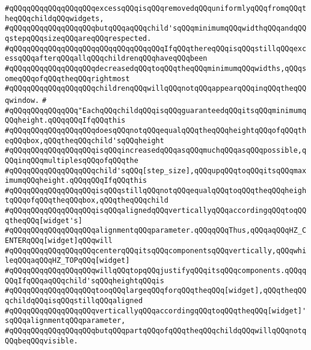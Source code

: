 \verb|#qQQqqQQqqQQqqQQqqQQqexcessqQQqisqQQqremovedqQQquniformlyqQQqfromqQQqtheqQQqchildqQQqwidgets,|\newline
\verb|#qQQqqQQqqQQqqQQqqQQqbutqQQqaqQQqchild'sqQQqminimumqQQqwidthqQQqandqQQqstepqQQqsizeqQQqareqQQqrespected.|\newline
\verb|#qQQqqQQqqQQqqQQqqQQqqQQqqQQqqQQqqQQqIfqQQqthereqQQqisqQQqstillqQQqexcessqQQqafterqQQqallqQQqchildrenqQQqhaveqQQqbeen|\newline
\verb|#qQQqqQQqqQQqqQQqqQQqdecreasedqQQqtoqQQqtheqQQqminimumqQQqwidths,qQQqsomeqQQqofqQQqtheqQQqrightmost|\newline
\verb|#qQQqqQQqqQQqqQQqqQQqchildrenqQQqwillqQQqnotqQQqappearqQQqinqQQqtheqQQqwindow.|\newline
\verb|#|\newline
\verb|#qQQqqQQqqQQqqQQq"EachqQQqchildqQQqisqQQqguaranteedqQQqitsqQQqminimumqQQqheight.qQQqqQQqIfqQQqthis|\newline
\verb|#qQQqqQQqqQQqqQQqqQQqdoesqQQqnotqQQqequalqQQqtheqQQqheightqQQqofqQQqtheqQQqbox,qQQqtheqQQqchild'sqQQqheight|\newline
\verb|#qQQqqQQqqQQqqQQqqQQqisqQQqincreasedqQQqasqQQqmuchqQQqasqQQqpossible,qQQqinqQQqmultiplesqQQqofqQQqthe|\newline
\verb|#qQQqqQQqqQQqqQQqqQQqchild'sqQQq[step_size],qQQqupqQQqtoqQQqitsqQQqmaximumqQQqheight.qQQqqQQqIfqQQqthis|\newline
\verb|#qQQqqQQqqQQqqQQqqQQqisqQQqstillqQQqnotqQQqequalqQQqtoqQQqtheqQQqheightqQQqofqQQqtheqQQqbox,qQQqtheqQQqchild|\newline
\verb|#qQQqqQQqqQQqqQQqqQQqisqQQqalignedqQQqverticallyqQQqaccordingqQQqtoqQQqtheqQQq[widget's]|\newline
\verb|#qQQqqQQqqQQqqQQqqQQqalignmentqQQqparameter.qQQqqQQqThus,qQQqaqQQqHZ_CENTERqQQq[widget]qQQqwill|\newline
\verb|#qQQqqQQqqQQqqQQqqQQqcenterqQQqitsqQQqcomponentsqQQqvertically,qQQqwhileqQQqaqQQqHZ_TOPqQQq[widget]|\newline
\verb|#qQQqqQQqqQQqqQQqqQQqwillqQQqtopqQQqjustifyqQQqitsqQQqcomponents.qQQqqQQqIfqQQqaqQQqchild'sqQQqheightqQQqis|\newline
\verb|#qQQqqQQqqQQqqQQqqQQqtooqQQqlargeqQQqforqQQqtheqQQq[widget],qQQqtheqQQqchildqQQqisqQQqstillqQQqaligned|\newline
\verb|#qQQqqQQqqQQqqQQqqQQqverticallyqQQqaccordingqQQqtoqQQqtheqQQq[widget]'sqQQqalignmentqQQqparameter,|\newline
\verb|#qQQqqQQqqQQqqQQqqQQqbutqQQqpartqQQqofqQQqtheqQQqchildqQQqwillqQQqnotqQQqbeqQQqvisible.|\newline
